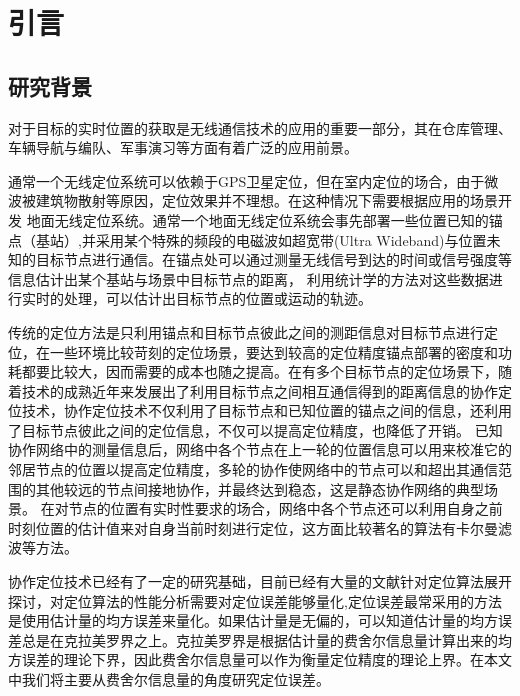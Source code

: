 \chapter{引言}
\label{cha:intro}

\section{研究背景}
对于目标的实时位置的获取是无线通信技术的应用的重要一部分\cite{indoorPos}，其在仓库管理、车辆导航与编队、军事演习等方面有着广泛的应用前景。


通常一个无线定位系统可以依赖于GPS卫星定位，但在室内定位的场合，由于微波被建筑物散射等原因，定位效果并不理想。在这种情况下需要根据应用的场景开发
地面无线定位系统。通常一个地面无线定位系统会事先部署一些位置已知的锚点（基站）,并采用某个特殊的频段的电磁波如超宽带(Ultra Wideband)与位置未知的目标节点进行通信。在锚点处可以通过测量无线信号到达的时间或信号强度等信息估计出某个基站与场景中目标节点的距离，
利用统计学的方法对这些数据进行实时的处理，可以估计出目标节点的位置或运动的轨迹。


传统的定位方法是只利用锚点和目标节点彼此之间的测距信息对目标节点进行定位，在一些环境比较苛刻的定位场景，要达到较高的定位精度锚点部署的密度和功耗都要比较大，因而需要的成本也随之提高。在有多个目标节点的定位场景下，随着技术的成熟近年来发展出了利用目标节点之间相互通信得到的距离信息的协作定位技术，协作定位技术不仅利用了目标节点和已知位置的锚点之间的信息，还利用了目标节点彼此之间的定位信息，不仅可以提高定位精度，也降低了开销。
已知协作网络中的测量信息后，网络中各个节点在上一轮的位置信息可以用来校准它的邻居节点的位置以提高定位精度，多轮的协作使网络中的节点可以和超出其通信范围的其他较远的节点间接地协作，并最终达到稳态，这是静态协作网络的典型场景。
在对节点的位置有实时性要求的场合，网络中各个节点还可以利用自身之前时刻位置的估计值来对自身当前时刻进行定位，这方面比较著名的算法有卡尔曼滤波\cite{KF}等方法。

协作定位技术已经有了一定的研究基础，目前已经有大量的文献针对定位算法展开探讨，对定位算法的性能分析需要对定位误差能够量化,定位误差最常采用的方法是使用估计量的均方误差来量化。如果估计量是无偏的，可以知道估计量的均方误差总是在克拉美罗界之上\cite{siyi}。克拉美罗界是根据估计量的费舍尔信息量计算出来的均方误差的理论下界，因此费舍尔信息量可以作为衡量定位精度的理论上界。在本文中我们将主要从费舍尔信息量的角度研究定位误差。

